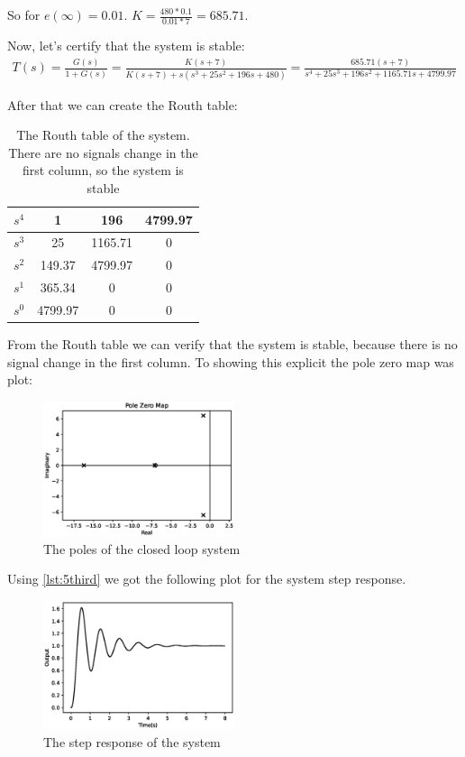 \documentclass[a4paper]{article}
\begin{document}
So for $e(\infty)=0.01$. $K=\frac{480*0.1}{0.01*7}=685.71$.

Now, let's certify that the system is stable:
\begin{align*}
    T(s) = \frac{G(s)}{1+G(s)}=\frac{K(s+7)}{K(s+7)+s(s^3+25s^2+196s+480)}=\frac{685.71(s+7)}{s^4+25s^3+196s^2+1165.71s+4799.97}
\end{align*}

	After that we can create the Routh table:
\begin{table}[H]
    \centering
    \begin{tabular}{|c|c|c|c|}
	\hline    
    $s^4$  & 1 & 196 & 4799.97\\
    \hline
    $s^3$ & 25 & 1165.71 & 0\\
    \hline
    $s^2$ & 149.37 & 4799.97&0\\
    \hline
    $s^1$ & 365.34 &0& 0\\
    \hline
    $s^0$ & 4799.97 & 0 & 0\\
    \hline
    \end{tabular}
    \caption{The Routh table of the system. There are no signals change in the first column, so the system is stable}
    \label{tab:my_label}
\end{table}
From the Routh table we can verify that the system is stable, because there is no signal change in the first column. To showing this explicit the pole zero 
map was plot:
\begin{figure}[H]
    \centering
    \includegraphics[width=0.5\textwidth]{Figures/Question5/EXE_5_ITEM_4.eps}
    \caption{The poles of the closed loop system}
    \label{fig:my_label}
\end{figure}
Using \ref{lst:5third} we got the following plot for the system step response.
\begin{figure}[H]
    \centering
    \includegraphics[width=0.5\textwidth]{Figures/Question5/EXE_5_ITEM_3.eps}
    \caption{The step response of the system}
    \label{fig:my_label}
\end{figure}
\end{document}
